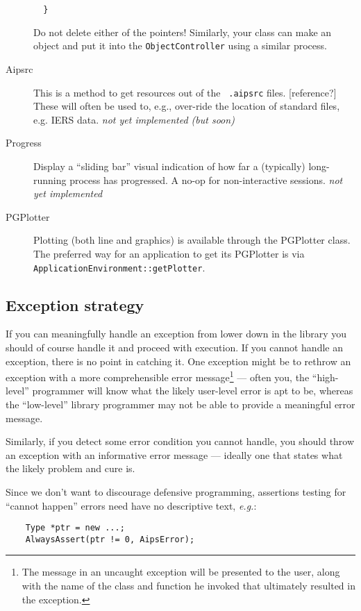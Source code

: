 \begin{description}
\begin{verbatim}
  }
  \end{verbatim}
  Do not delete either of the pointers! Similarly, your class can make
  an object and put it into the {\tt ObjectController} using a similar
  process.
  \item[Aipsrc] This is a method to get resources out of the {\tt
  .aipsrc} files. [reference?] These will often be used to, e.g.,
  over-ride the location of standard files, e.g. IERS data.  {\em not
  yet implemented (but soon)}
  \item[Progress] Display a ``sliding bar'' visual indication of how
  far a (typically) long-running process has progressed. A no-op for
  non-interactive sessions. {\em not yet implemented} 
  \item[PGPlotter] Plotting (both line and graphics) is available through the
                   PGPlotter class. The preferred way for an application to
                   get its PGPlotter is via 
                   {\tt ApplicationEnvironment::getPlotter}.
\end{description}

\subsection{Exception strategy}

If you can meaningfully handle an exception from lower down in the
library you should of course handle it and proceed with execution. If
you cannot handle an exception, there is no point in catching it. One
exception might be to rethrow an exception with a more comprehensible
error message\footnote{The message in an uncaught exception will be
presented to the user, along with the name of the class and function
he invoked that ultimately resulted in the exception.} --- often you,
the ``high-level'' programmer will know what the likely user-level
error is apt to be, whereas the ``low-level'' library programmer 
may not be able to provide a meaningful error message.

Similarly, if you detect some error condition you cannot handle, you
should throw an exception with an informative error message ---
ideally one that states what the likely problem and cure is.

Since we don't want to discourage defensive programming, assertions
testing for ``cannot happen'' errors need have no descriptive text,
{\em e.g.}:
\begin{verbatim}
    Type *ptr = new ...;
    AlwaysAssert(ptr != 0, AipsError);
\end{verbatim}

